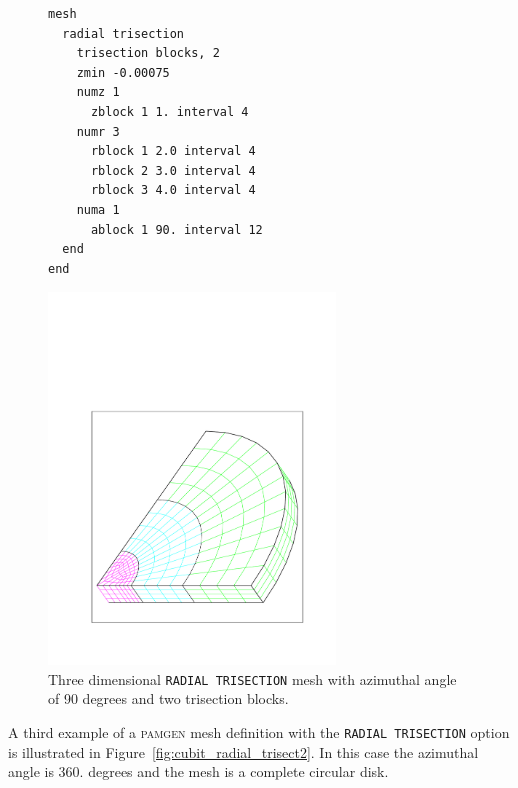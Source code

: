 \begin{figure}[htbp]
\centering
  \begin{minipage}[c]{0.4\linewidth}
    \centering
{\ttfamily \begin{verbatim}
mesh
  radial trisection
    trisection blocks, 2
    zmin -0.00075
    numz 1
      zblock 1 1. interval 4
    numr 3 
      rblock 1 2.0 interval 4
      rblock 2 3.0 interval 4
      rblock 3 4.0 interval 4
    numa 1
      ablock 1 90. interval 12
  end
end
\end{verbatim}}
  \end{minipage}%
  \hfil
  \begin{minipage}[c]{0.6\linewidth}
    \centering
      \includegraphics[width=3.0in]{cubit_radial_trisection}
  \end{minipage}
  \caption [A \texttt{RADIAL TRISECTION} mesh with three trisection blocks.] {Three dimensional \texttt{RADIAL TRISECTION} mesh with azimuthal
    angle of 90 degrees and two trisection blocks.}
  \label{fig:cubit_radial_trisect1}
\end{figure}


A third example of a \textsc{pamgen} mesh definition with the
\texttt{RADIAL TRISECTION} option is illustrated in
Figure~\ref{fig:cubit_radial_trisect2}. In this case the azimuthal
angle is 360. degrees and the mesh is a complete circular disk. 

